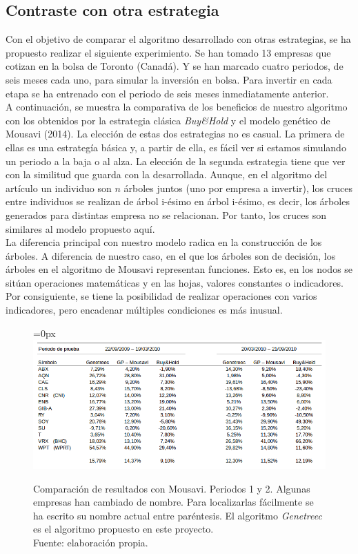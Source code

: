 \subsection{Contraste con otra estrategia}

Con el objetivo de comparar el algoritmo desarrollado con otras estrategias, se ha propuesto realizar el siguiente experimiento. Se han tomado 13 empresas que cotizan en la bolsa de Toronto (Canad\'a). Y se han marcado cuatro periodos, de seis meses cada uno, para simular la inversi\'on en bolsa. Para invertir en cada etapa se ha entrenado con el periodo de seis meses inmediatamente anterior.\\

A continuaci\'on, se muestra la comparativa de los beneficios de nuestro algoritmo con los obtenidos por la estrategia cl\'asica \textit{Buy\&Hold} y el modelo gen\'etico de Mousavi (2014). La elecci\'on de estas dos estrategias no es casual. La primera de ellas es una estrateg\'ia b\'asica y, a partir de ella, es f\'acil ver si estamos simulando un periodo a la baja o al alza. La elecci\'on de la segunda estrategia tiene que ver con la similitud que guarda con la desarrollada. Aunque, en el algoritmo del art\'iculo un individuo son $n$ \'arboles juntos (uno por empresa a invertir), los cruces entre individuos se realizan de \'arbol i-\'esimo en \'arbol i-\'esimo, es decir, los \'arboles generados para distintas  empresa no se relacionan. Por tanto, los cruces son similares al modelo propuesto aqu\'i.\\

La diferencia principal con nuestro modelo radica en la construcci\'on de los \'arboles. A diferencia de nuestro caso, en el que los \'arboles son de decisi\'on, los \'arboles en el algoritmo de Mousavi representan funciones. Esto es, en los nodos se sit\'uan operaciones matem\'aticas y en las hojas, valores constantes o indicadores. Por consiguiente, se tiene la posibilidad de realizar operaciones con varios indicadores, pero encadenar m\'ultiples condiciones es m\'as inusual.

     	\begin{figure}[H]
     		\centering\leftskip=0px
     		\includegraphics[scale=2]{imagenes/Mousavi1.png}
     		\caption[Comparaci\'on de resultados con Mousavi]{Comparaci\'on de resultados con Mousavi. Periodos 1 y 2. Algunas empresas han cambiado de nombre. Para localizarlas f\'acilmente se ha escrito su nombre actual entre par\'entesis. El algoritmo \textit{Genetreec} es el algoritmo propuesto en este proyecto.\\ Fuente: elaboraci\'on propia.}
     		\label{fig:Mousavi1}
     	\end{figure} 
     

